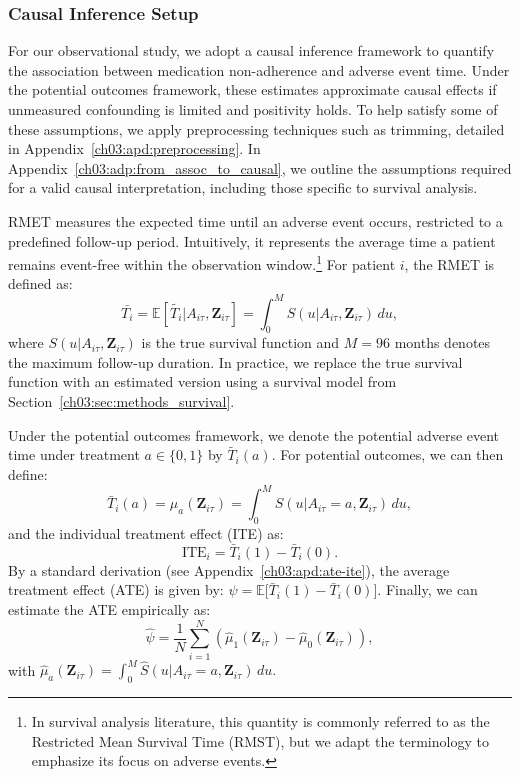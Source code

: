 \subsubsection{Causal Inference Setup}
\label{ch03:sec:methods_causal}
For our observational study, we adopt a causal inference framework to quantify the association between medication non-adherence and adverse event time.
Under the potential outcomes framework, these estimates approximate causal effects if unmeasured confounding is limited and positivity holds.
To help satisfy some of these assumptions, we apply preprocessing techniques such as trimming, detailed in Appendix~\ref{ch03:apd:preprocessing}.
In Appendix~\ref{ch03:adp:from_assoc_to_causal}, we outline the assumptions required for a valid causal interpretation, including those specific to survival analysis.

RMET measures the expected time until an adverse event occurs, restricted to a predefined follow-up period.
Intuitively, it represents the average time a patient remains event-free within the observation window.\footnote{In survival analysis literature, this quantity is commonly referred to as the Restricted Mean Survival Time (RMST), but we adapt the terminology to emphasize its focus on adverse events.}
For patient \(i\), the RMET is defined as:
\[
\bar{T_i} = \mathbb{E}[\widetilde{T_i} | A_{i\tau}, \mathbf{Z}_{i\tau}] = \int_{0}^{M} {S}(u | A_{i\tau}, \mathbf{Z}_{i\tau}) \, du,
\]
where \( {S}(u | A_{i\tau}, \mathbf{Z}_{i\tau}) \) is the true survival function and \( M = 96 \) months denotes the maximum follow-up duration.
In practice, we replace the true survival function with an estimated version using a survival model from Section~\ref{ch03:sec:methods_survival}.

Under the potential outcomes framework, we denote the potential adverse event time under treatment \(a \in \{0,1\}\) by \(\widetilde{T_i}(a)\).
For potential outcomes, we can then define:
\[
\bar{T}_i(a) = \mu_a(\mathbf{Z}_{i\tau}) =\int_{0}^{M} S(u | A_{i\tau} = a, \mathbf{Z}_{i\tau})\, du,
\]
and the individual treatment effect (ITE) as:
\[
\text{ITE}_i = \bar{T}_i(1) - \bar{T}_i(0).
\]
By a standard derivation (see Appendix~\ref{ch03:apd:ate-ite}), the average treatment effect (ATE) is given by:
\(
\psi = \mathbb{E}\big[\bar{T}_i(1) - \bar{T}_i(0)\big].
\)
Finally, we can estimate the ATE empirically as:
\[
\widehat{\psi} = \frac{1}{N} \sum_{i=1}^{N}\left(\widehat{\mu}_1(\mathbf{Z}_{i\tau}) - \widehat{\mu}_0(\mathbf{Z}_{i\tau})\right),
\]
with
\(
\widehat{\mu}_a(\mathbf{Z}_{i\tau}) = \int_{0}^{M} \widehat{S}(u | A_{i\tau} = a, \mathbf{Z}_{i\tau})\, du.
\)

